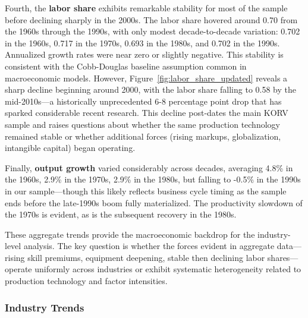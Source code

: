 \documentclass[12pt]{article}
\begin{document}
Fourth, the \textbf{labor share} exhibits remarkable stability for most of the sample before declining sharply in the 2000s. The labor share hovered around 0.70 from the 1960s through the 1990s, with only modest decade-to-decade variation: 0.702 in the 1960s, 0.717 in the 1970s, 0.693 in the 1980s, and 0.702 in the 1990s. Annualized growth rates were near zero or slightly negative. This stability is consistent with the Cobb-Douglas baseline assumption common in macroeconomic models. However, Figure~\ref{fig:labor_share_updated} reveals a sharp decline beginning around 2000, with the labor share falling to 0.58 by the mid-2010s---a historically unprecedented 6-8 percentage point drop that has sparked considerable recent research. This decline post-dates the main KORV sample and raises questions about whether the same production technology remained stable or whether additional forces (rising markups, globalization, intangible capital) began operating.

Finally, \textbf{output growth} varied considerably across decades, averaging 4.8\% in the 1960s, 2.9\% in the 1970s, 2.9\% in the 1980s, but falling to -0.5\% in the 1990s in our sample---though this likely reflects business cycle timing as the sample ends before the late-1990s boom fully materialized. The productivity slowdown of the 1970s is evident, as is the subsequent recovery in the 1980s.

These aggregate trends provide the macroeconomic backdrop for the industry-level analysis. The key question is whether the forces evident in aggregate data---rising skill premiums, equipment deepening, stable then declining labor shares---operate uniformly across industries or exhibit systematic heterogeneity related to production technology and factor intensities.

\subsubsection{Industry Trends}
\end{document}
